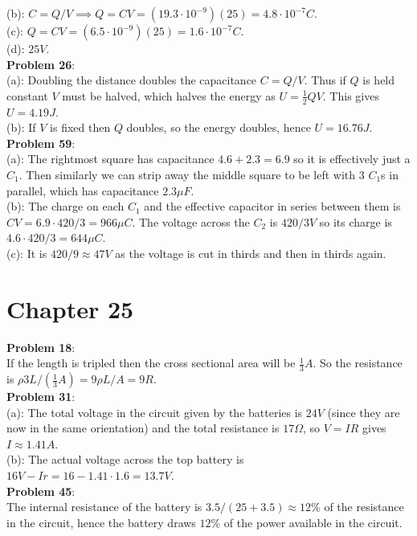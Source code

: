 \documentclass{amsart}
\begin{document}
	(b): $C = Q/V \implies Q = CV = (19.3 \cdot 10^{-9})(25) = 4.8 \cdot 10^{-7} C$.\\
	
	(c): $Q = CV = (6.5\cdot 10^{-9})(25) = 1.6 \cdot 10^{-7} C$.\\
	
	(d): $25V$.\\
	
	\textbf{Problem 26}:\\
	
	(a): Doubling the distance doubles the capacitance $C=Q/V$. Thus if $Q$ is held constant $V$ must be halved, which halves the energy as $U=\tfrac12 QV$. This gives $U=4.19 J$.\\
	
	(b): If $V$ is fixed then $Q$ doubles, so the energy doubles, hence $U=16.76 J$.\\
	
	\textbf{Problem 59}:\\
	
	(a): The rightmost square has capacitance $4.6+2.3=6.9$ so it is effectively just a $C_1$. Then similarly we can strip away the middle square to be left with 3 $C_1$s in parallel, which has capacitance $2.3 \mu F$.\\
	
	(b): The charge on each $C_1$ and the effective capacitor in series between them is $CV = 6.9 \cdot 420/3 = 966 \mu C$. The voltage across the $C_2$ is $420/3 V$ so its charge is $4.6\cdot 420/3 = 644 \mu C$.\\
	
	(c): It is $420/9 \approx 47 V$ as the voltage is cut in thirds and then in thirds again.\\
	
	\section*{Chapter 25}
	
	\textbf{Problem 18}:\\
	
	If the length is tripled then the cross sectional area will be $\tfrac13 A$. So the resistance is $\rho 3L/(\tfrac13 A) = 9\rho L/A = 9R$.\\
	
	\textbf{Problem 31}:\\
	
	(a): The total voltage in the circuit given by the batteries is $24V$ (since they are now in the same orientation) and the total resistance is $17\Omega$, so $V=IR$ gives $I\approx 1.41 A$. \\
	
	(b): The actual voltage across the top battery is $16V - Ir = 16 - 1.41\cdot 1.6 = 13.7 V$.\\
	
	\textbf{Problem 45}:\\
	
	The internal resistance of the battery is $3.5/(25+3.5)\approx 12\%$ of the resistance in the circuit, hence the battery draws $12\%$ of the power available in the circuit.
	
\end{document}
